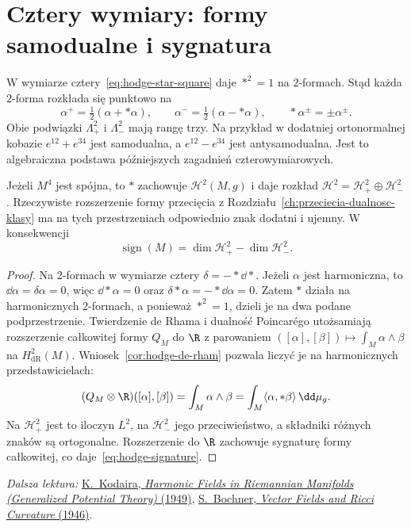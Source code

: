 \section{Cztery wymiary: formy samodualne i sygnatura}
\label{sec:hodge-four-manifolds}

W wymiarze cztery~\eqref{eq:hodge-star-square} daje
$*^2=1$ na $2$-formach. Stąd każda $2$-forma rozkłada się
punktowo na
\[
 \alpha^+=\tfrac12(\alpha+*\alpha),\qquad
 \alpha^-=\tfrac12(\alpha-*\alpha),\qquad
 *\alpha^\pm=\pm\alpha^\pm.
\]
Obie podwiązki $\Lambda^2_+$ i $\Lambda^2_-$ mają rangę
trzy. Na przykład w dodatniej ortonormalnej kobazie
$e^{12}+e^{34}$ jest samodualna, a $e^{12}-e^{34}$
jest antysamodualna. Jest to algebraiczna podstawa
późniejszych zagadnień czterowymiarowych.

\begin{stwierdzenie}
\label{prop:hodge-signature}
Jeżeli $M^4$ jest spójna, to $*$ zachowuje
$\mathcal H^2(M,g)$ i daje rozkład
$\mathcal H^2=\mathcal H^2_+\oplus\mathcal H^2_-$.
Rzeczywiste rozszerzenie formy przecięcia z
Rozdziału~\ref{ch:przeciecia-dualnosc-klasy}
ma na tych przestrzeniach odpowiednio znak dodatni
i ujemny. W konsekwencji
\begin{equation}\label{eq:hodge-signature}
 \operatorname{sign}(M)
 =\dim\mathcal H^2_+-\dim\mathcal H^2_-.
\end{equation}
\end{stwierdzenie}
\begin{proof}
Na $2$-formach w wymiarze cztery
$\delta=-*\dd*$. Jeżeli $\alpha$ jest harmoniczna,
to $\dd\alpha=\delta\alpha=0$, więc
$\dd*\alpha=0$ oraz $\delta*\alpha=-*\dd\alpha=0$.
Zatem $*$ działa na harmonicznych $2$-formach, a
ponieważ $*^2=1$, dzieli je na dwa podane podprzestrzenie.
Twierdzenie de Rhama i dualność Poincarégo
utożsamiają rozszerzenie całkowitej formy
$Q_M$ do $\R$ z parowaniem
$([\alpha],[\beta])\mapsto\int_M\alpha\wedge\beta$
na $H^2_{\mathrm{dR}}(M)$. Wniosek~\ref{cor:hodge-de-rham}
pozwala liczyć je na harmonicznych przedstawicielach:
\[
 (Q_M\otimes\R)([\alpha],[\beta])=\int_M\alpha\wedge\beta
 =\int_M\langle\alpha,*\beta\rangle\,\dd\mu_g.
\]
Na $\mathcal H^2_+$ jest to iloczyn $L^2$, na
$\mathcal H^2_-$ jego przeciwieństwo, a składniki
różnych znaków są ortogonalne. Rozszerzenie do $\R$
zachowuje sygnaturę formy całkowitej, co
daje~\eqref{eq:hodge-signature}.
\end{proof}

\par\smallskip
{\footnotesize\noindent\emph{Dalsza lektura:}
\href{https://doi.org/10.2307/1969552}
{K.\ Kodaira, \emph{Harmonic Fields in Riemannian Manifolds
(Generalized Potential Theory)} (1949)},
\href{https://doi.org/10.1090/S0002-9904-1946-08647-4}
{S.\ Bochner, \emph{Vector Fields and Ricci Curvature} (1946)}.\par}
